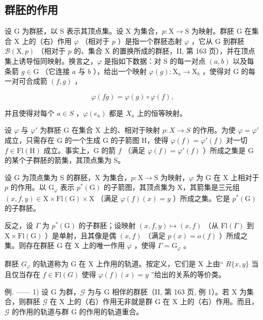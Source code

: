 \subsection{群胚的作用}

设 G 为群胚，以 S 表示其顶点集。设 X 为集合，\(p\colon \mathrm{X}\to \mathrm{S}\) 为映射。群胚 G 在集合 X 上的（右）作用 \(\varphi\) （相对于 \(p\) ）是指一个群胚态射 \(\varphi\) ，它从 G 到群胚 \(\mathcal{B}(\mathrm{X},p)\) （相对于 \(p\) 的、集合 X 的置换所成的群胚，II, 第 163 页），并在顶点集上诱导恒同映射。换言之，\(\varphi\) 是指如下数据：对 S 的每一对点 \((a,b)\) 以及每条箭 \(g\in \mathrm{G}\) （它连接 \(a\) 与 \(b\) ），给出一个映射 \(\varphi (g)\colon \mathrm{X}_a\to \mathrm{X}_b\) ，使得对 G 的每一对可合成箭 \((f,g)\) ，

\[
\varphi (f g) = \varphi (g) \circ \varphi (f),
\]

并且使得对每个 \(a \in S\) ，\(\varphi(e_a)\) 都是 \(X_a\) 上的恒等映射。

设 \(\varphi\) 与 \(\varphi'\) 为群胚 G 在集合 X 上的、相对于映射 \(p\colon X\to S\) 的作用。为使 \(\varphi=\varphi'\) 成立，只需存在 G 的一个生成 G 的子箭图 H，使得 \(\varphi(f)=\varphi'(f)\) 对一切 \(f\in\mathrm{Fl}(\mathrm{H})\) 成立。事实上，G 的箭 \(f\) （满足 \(\varphi(f)=\varphi'(f)\) ）所成之集是 G 的某个子群胚的箭集，其顶点集为 S。

设 G 为顶点集为 S 的群胚，X 为集合，\(p \colon \mathrm{X} \to \mathrm{S}\) 为映射，\(\varphi\) 为 G 在 X 上相对于 \(p\) 的作用。以 \(\mathrm{G}_{\varphi}\) 表示 \(p^{*}(\mathrm{G})\) 的子箭图，其顶点集为 X，其箭集是三元组 \((x, f, y) \in \mathrm{X} \times \mathrm{Fl}(\mathrm{G}) \times \mathrm{X}\) （满足 \(\varphi(f)(x) = y\) ）所成之集。它是 \(p^{*}(\mathrm{G})\) 的子群胚。

反之，设 \(\Gamma\) 为 \(p^{*}(\mathrm{G})\) 的子群胚；设映射 \((x,f,y)\mapsto (x,f)\) （从 \(\mathrm{Fl}(\Gamma)\) 到 \(\mathrm{X}\times \mathrm{Fl}(\mathrm{G})\) ）是单射，且其像是偶 \((x,f)\) （满足 \(p(x) = o(f)\) ）所成之集。则存在群胚 G 在 X 上的唯一作用 \(\varphi\) ，使得 \(\Gamma = \mathrm{G}_{\varphi}\) 。

群胚 \(G_{\varphi}\) 的轨道称为 G 在 X 上作用的轨道。按定义，它们是 X 上由“ \(R\{x,y\}\) 当且仅当存在 \(f \in \mathrm{Fl}(G)\) 使得 \(\varphi(f)(x) = y\) ”给出的关系的等价类。

例. —— 1) 设 G 为群，\(\mathcal{G}\) 为与 G 相伴的群胚（II, 第 163 页, 例 1）。若 X 为集合，则群胚 \(\mathcal{G}\) 在 X 上的（右）作用无非就是群 G 在 X 上的（右）作用。而且，\(\mathcal{G}\) 的作用的轨道与群 G 的作用的轨道重合。

